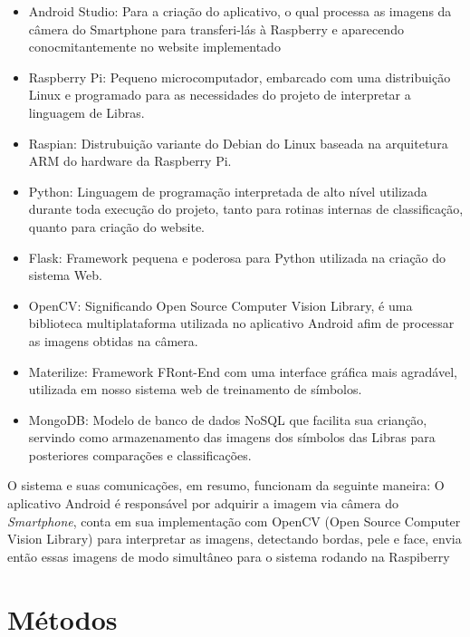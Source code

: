 \begin{itemize}
	\item Android Studio: Para a criação do aplicativo, o qual processa as imagens da câmera do Smartphone para transferi-lás à Raspberry e aparecendo conocmitantemente no website implementado 

	\item Raspberry Pi: Pequeno microcomputador, embarcado com uma distribuição Linux e programado para as necessidades do projeto de interpretar a linguagem de Libras.
	\item Raspian: Distrubuição variante do Debian do Linux baseada na arquitetura ARM do hardware da Raspberry Pi.
	\item Python: Linguagem de programação interpretada de alto nível utilizada durante toda execução do projeto, tanto para rotinas internas de classificação, quanto para criação do website.
    \item Flask: Framework pequena e poderosa para Python utilizada na criação do sistema Web.
	\item OpenCV: Significando Open Source Computer Vision Library, é uma biblioteca multiplataforma utilizada no aplicativo Android afim de processar as imagens obtidas na câmera.
	
	\item Materilize: Framework FRont-End com uma interface gráfica mais agradável, utilizada em nosso sistema web de treinamento de símbolos.
	\item MongoDB: Modelo de banco de dados NoSQL que facilita sua crianção, servindo como armazenamento das imagens dos símbolos das Libras para posteriores comparações e classificações.
    
\end{itemize}

\par O sistema e suas comunicações, em resumo, funcionam da seguinte maneira: O aplicativo Android é responsável por adquirir a imagem via câmera do \textit{Smartphone}, conta em sua implementação com OpenCV (Open Source Computer Vision Library) para interpretar as imagens, detectando bordas, pele e face, envia então essas imagens de modo simultâneo para o sistema rodando na Raspiberry


\section{Métodos}

